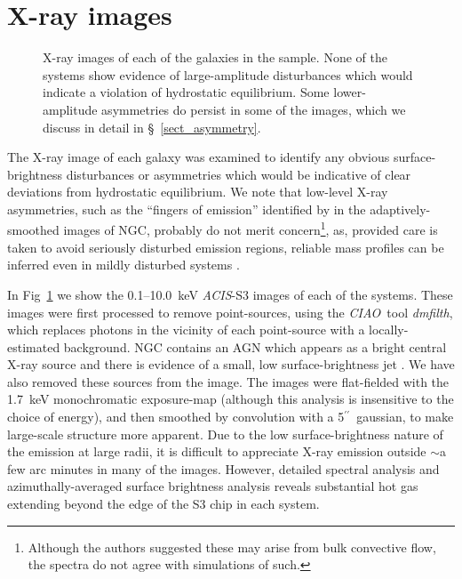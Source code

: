 \documentclass{emulateapj}
\def \arcsec {\hbox{$^{\prime\prime}$}}
\newcommand{\acis }{{\em ACIS}}
\newcommand{\ciao }{{\em CIAO}}
\newcommand{\thin}{\thinspace}
\begin{document}
\section{X-ray images} \label{sect_imaging}
\begin{figure}
\centering
\caption{X-ray images of each of the galaxies in the sample. None of 
the systems show evidence of large-amplitude disturbances which would
indicate a violation of hydrostatic equilibrium. Some lower-amplitude
asymmetries do persist in some of the images, which we discuss in 
detail in \S~\ref{sect_asymmetry}.}
\label{fig_images}
\end{figure}
The X-ray image of each galaxy was examined to identify any 
obvious surface-brightness disturbances or asymmetries 
which would be indicative of clear deviations from hydrostatic equilibrium.
We note that low-level X-ray asymmetries, 
such as the ``fingers of emission'' identified by 
\citet{randall03} in the adaptively-smoothed images of NGC\thin 4649,
probably do not merit concern\footnote{Although the authors suggested these
may arise from bulk convective flow, the spectra do not agree with 
simulations of such.}, as, provided care is taken to avoid
seriously disturbed emission regions, reliable mass profiles can
be inferred even in mildly disturbed systems \citep{buote95a}.

In Fig~\ref{fig_images} we show the 0.1--10.0~keV 
\acis-S3 images of each of the systems. 
These images were first processed to remove point-sources, 
using the \ciao\ tool {\em dmfilth}, which replaces photons in the vicinity
of each point-source with a locally-estimated background.
NGC\thin 4261 contains an AGN which appears as a bright central X-ray
source and there is evidence of a small, low surface-brightness 
jet \citep{zezas05a}. We have also removed these 
sources from the image. The images were flat-fielded with the 
1.7~keV monochromatic exposure-map (although this analysis is insensitive
to the choice of energy), and then smoothed by convolution with a 5\arcsec\
gaussian, to make large-scale structure more apparent. 
Due to the 
low surface-brightness nature of the emission at large radii, it 
is difficult to appreciate X-ray emission outside $\sim$a few arc minutes
in many of the images. However, detailed 
spectral analysis and azimuthally-averaged surface brightness analysis
reveals substantial hot gas extending beyond the edge of the S3 chip
in each system. 
\end{document}
